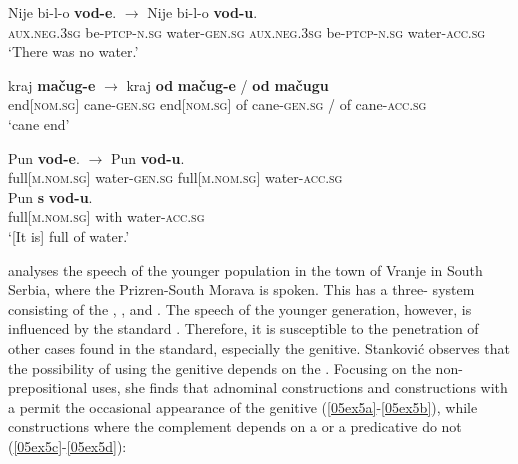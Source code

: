 \documentclass[output=paper,colorlinks,citecolor=brown]{langscibook}
\begin{document}
\begin{exe}
	\ex
	\begin{xlist}
		\ex \label{05ex4a}
		\gll Nije bi-l-o \textbf{vod-e}. $\rightarrow$ Nije bi-l-o \textbf{vod-u}. \\
		\textsc{aux.neg.3sg} be-\textsc{ptcp-n.sg} water-\textsc{gen.sg} \phantom{} \textsc{aux.neg.3sg} be-\textsc{ptcp-n.sg} water-\textsc{acc.sg} \\
		\trans ‘There was no water.’
		
		\ex \label{05ex4b}
		\gll kraj \textbf{mačug-e} $\rightarrow$ kraj \textbf{od} \textbf{mačug-e} / \textbf{od} \textbf{mačugu} \\
		end[\textsc{nom.sg}] cane-\textsc{gen.sg} \phantom{} end[\textsc{nom.sg}] of cane-\textsc{gen.sg} / of cane-\textsc{acc.sg} \\
		\trans ‘cane end’
		
		\ex \label{05ex4c}
		\gll Pun \textbf{vod-e}. $\rightarrow$ Pun \textbf{vod-u}. \\
		full[\textsc{m.nom.sg}] water-\textsc{gen.sg} \phantom{} full[\textsc{m.nom.sg}] water-\textsc{acc.sg} \\
		\gll \phantom{full.m.nom.sg water-gen.sg $\rightarrow$} Pun \textbf{s} \textbf{vod-u}. \\
		\phantom{full.[m.nom.sg] water-gen.sg $\rightarrow$} full[\textsc{m.nom.sg}] with water-\textsc{acc.sg} \\
		\trans ‘[It is] full of water.’
	\end{xlist}
\end{exe}

\citet{stankovic2022} analyses the speech of the younger population in the town of Vranje in South Serbia, where the Prizren-South Morava  is spoken. This  has a three- system consisting of the , , and . The speech of the younger generation, however, is influenced by the standard . Therefore, it is susceptible to the penetration of other cases found in the standard, especially the genitive. Stanković observes that the possibility of using the genitive depends on the . Focusing on the non-prepositional uses, she finds that adnominal constructions and constructions with a  permit the occasional appearance of the genitive  (\ref{05ex5a}-\ref{05ex5b}), while constructions where the complement depends on a  or a predicative  do not (\ref{05ex5c}-\ref{05ex5d}):
\end{document}
